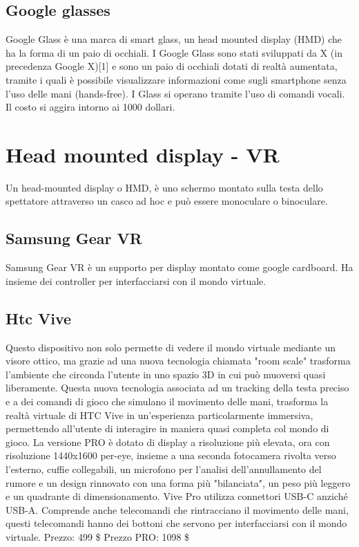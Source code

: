 \documentclass[8pt]{extarticle}
\begin{document}
\begin{multicols}{3}
\subsection{Google glasses}
Google Glass è una marca di smart glass, un head mounted display (HMD) che ha la forma di un paio di occhiali. I Google Glass sono stati sviluppati da X (in precedenza Google X)[1] e sono un paio di occhiali dotati di realtà aumentata, tramite i quali è possibile visualizzare informazioni come sugli smartphone senza l'uso delle mani (hands-free). I Glass si operano tramite l'uso di comandi vocali.
Il costo si aggira intorno ai 1000 dollari.

\section{Head mounted display - VR}
Un head-mounted display o HMD, è uno schermo montato sulla testa dello spettatore attraverso un casco ad hoc e può essere monoculare o binoculare.
\subsection{Samsung Gear VR}
Samsung Gear VR è un supporto per display montato come google cardboard.
Ha insieme dei controller per interfacciarsi con il mondo virtuale.
\subsection{Htc Vive}
Questo dispositivo non solo permette di vedere il mondo virtuale mediante un visore ottico, ma grazie ad una nuova tecnologia chiamata "room scale" trasforma l'ambiente che circonda l'utente in uno spazio 3D in cui può muoversi quasi liberamente. Questa nuova tecnologia associata ad un tracking della testa preciso e a dei comandi di gioco che simulano il movimento delle mani, trasforma la realtà virtuale di HTC Vive in un'esperienza particolarmente immersiva, permettendo all'utente di interagire in maniera quasi completa col mondo di gioco.
La versione PRO è dotato di display a risoluzione più elevata, ora con risoluzione 1440x1600 per-eye, insieme a una seconda fotocamera rivolta verso l'esterno, cuffie collegabili, un microfono per l'analisi dell'annullamento del rumore e un design rinnovato con una forma più "bilanciata", un peso più leggero e un quadrante di dimensionamento. Vive Pro utilizza connettori USB-C anziché USB-A. Comprende anche telecomandi che rintracciano il movimento delle mani, questi telecomandi hanno dei bottoni che servono per interfacciarsi con il mondo virtuale.
Prezzo: 499 \$
Prezzo PRO: 1098 \$

\end{multicols}
\end{document}
